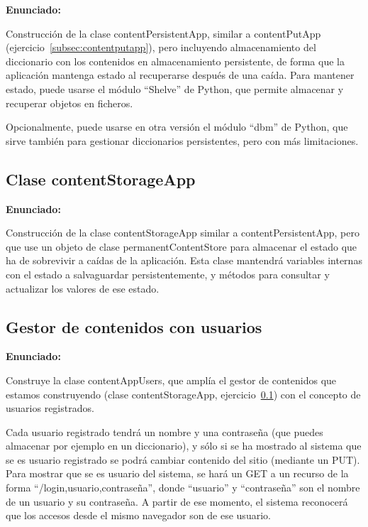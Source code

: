 \textbf{Enunciado:}

Construcción de la clase contentPersistentApp, similar a contentPutApp (ejercicio~\ref{subsec:contentputapp}), pero incluyendo almacenamiento del diccionario con los contenidos en almacenamiento persistente, de forma que la aplicación mantenga estado al recuperarse después de una caída. Para mantener estado, puede usarse el módulo ``Shelve'' de Python, que permite almacenar y recuperar objetos en ficheros.

Opcionalmente, puede usarse en otra versión el módulo ``dbm'' de Python, que sirve también para gestionar diccionarios persistentes, pero con más limitaciones.

\subsection{Clase contentStorageApp}
\label{subsec:contentstorageapp}

\textbf{Enunciado:}

Construcción de la clase contentStorageApp similar a contentPersistentApp, pero que use un objeto de clase permanentContentStore para almacenar el estado que ha de sobrevivir a caídas de la aplicación. Esta clase mantendrá variables internas con el estado a salvaguardar persistentemente, y métodos para consultar y actualizar los valores de ese estado.

\subsection{Gestor de contenidos con usuarios}
\label{subsec:contentappusers}

\textbf{Enunciado:}

Construye la clase contentAppUsers, que amplía el gestor de contenidos que estamos construyendo (clase contentStorageApp, ejercicio~\ref{subsec:contentstorageapp}) con el concepto de usuarios registrados.

Cada usuario registrado tendrá un nombre y una contraseña (que puedes almacenar por ejemplo en un diccionario), y sólo si se ha mostrado al sistema que se es usuario registrado se podrá cambiar contenido del sitio (mediante un PUT). Para mostrar que se es usuario del sistema, se hará un GET a un recurso de la forma ``/login,usuario,contraseña'', donde ``usuario'' y ``contraseña'' son el nombre de un usuario y su contraseña. A partir de ese momento, el sistema reconocerá que los accesos desde el mismo navegador son de ese usuario. 


